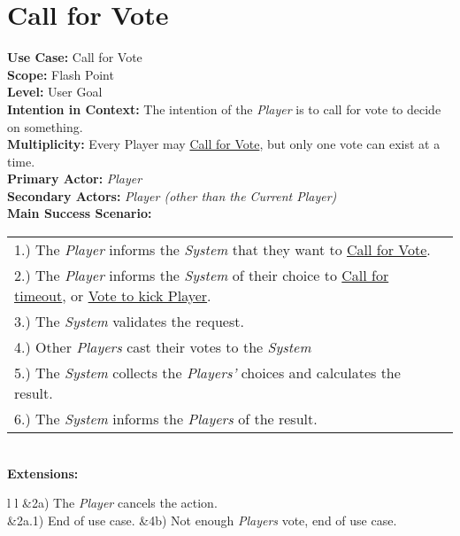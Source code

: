 \documentclass{article}
\begin{document}
	\section*{Call for Vote}
	\textbf{Use Case:} Call for Vote\\
	\textbf{Scope:} Flash Point\\
	\textbf{Level:} User Goal\\
	\textbf{Intention in Context:} The intention of the \textit{Player} is to call for vote to decide on something.\\
	\textbf{Multiplicity: } Every Player may \underline{Call for Vote}, but only one vote can exist at a time.\\
	\textbf{Primary Actor:} \textit{Player}\\
	\textbf{Secondary Actors:} \textit{Player (other than the Current Player)}\\
	\textbf{Main Success Scenario:}\\
	\begin{tabular}{l l}
		1.) The \textit{Player} informs the \textit{System} that they want to \underline{Call for Vote}.\\
		2.) The \textit{Player} informs the \textit{System} of their choice to \underline{Call for timeout}, or \underline{Vote to kick Player}.\\
		3.) The \textit{System} validates the request.\\
		4.) Other \textit{Players} cast their votes to the \textit{System}\\
		5.) The \textit{System} collects the \textit{Players'} choices and calculates the result.\\
		6.) The \textit{System} informs the \textit{Players} of the result.
	\end{tabular}\\
	\textbf{Extensions:}\\
	\begin{tabular}{l l}
		&2a) The \textit{Player} cancels the action.\\
		&2a.1) End of use case.
		&4b) Not enough \textit{Players} vote, end of use case.
	\end{tabular}
\end{document}
